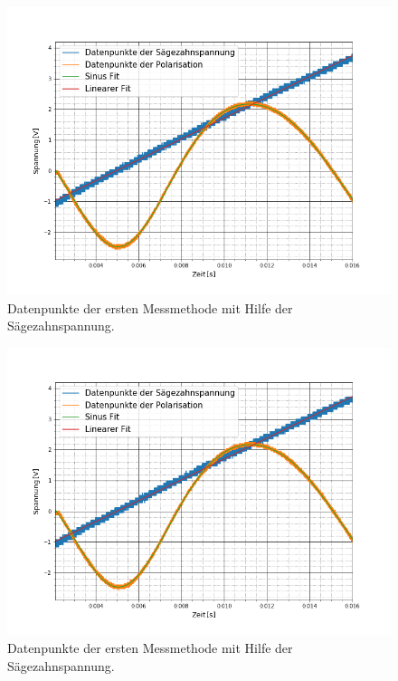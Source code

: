 \begin{figure}[ht]
	\includegraphics[scale=0.5]{Bild/V1_9}
	\centering
	\caption[Plot zu Versuchsteil 1 Nr.9]{Datenpunkte der ersten Messmethode mit Hilfe der Sägezahnspannung.}
\end{figure}
\begin{figure}[ht]
	\includegraphics[scale=0.5]{Bild/V1_10}
	\centering
	\caption[Plot zu Versuchsteil 1 Nr.10]{Datenpunkte der ersten Messmethode mit Hilfe der Sägezahnspannung.}
\end{figure}
